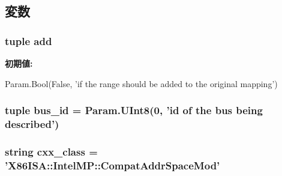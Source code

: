 \subsection{変数}
\hypertarget{classIntelMP_1_1X86IntelMPCompatAddrSpaceMod_ab1f40d21a14f4da963c0cfd61f6643b8}{
\subsubsection[{add}]{\setlength{\rightskip}{0pt plus 5cm}tuple {\bf add}}}
\label{classIntelMP_1_1X86IntelMPCompatAddrSpaceMod_ab1f40d21a14f4da963c0cfd61f6643b8}
{\bfseries 初期値:}
\begin{DoxyCode}
Param.Bool(False,
            'if the range should be added to the original mapping')
\end{DoxyCode}
\hypertarget{classIntelMP_1_1X86IntelMPCompatAddrSpaceMod_a6e34d01145c4deea78b58e36f0a7e81b}{
\subsubsection[{bus\_\-id}]{\setlength{\rightskip}{0pt plus 5cm}tuple {\bf bus\_\-id} = Param.UInt8(0, 'id of the bus being described')}}
\label{classIntelMP_1_1X86IntelMPCompatAddrSpaceMod_a6e34d01145c4deea78b58e36f0a7e81b}
\hypertarget{classIntelMP_1_1X86IntelMPCompatAddrSpaceMod_a58cd55cd4023648e138237cfc0822ae3}{
\subsubsection[{cxx\_\-class}]{\setlength{\rightskip}{0pt plus 5cm}string {\bf cxx\_\-class} = '{\bf X86ISA::IntelMP::CompatAddrSpaceMod}'}}
\label{classIntelMP_1_1X86IntelMPCompatAddrSpaceMod_a58cd55cd4023648e138237cfc0822ae3}


